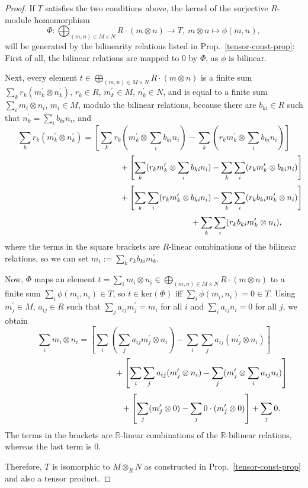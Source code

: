 \documentclass{amsart}
\theoremstyle{plain}
\numberwithin{equation}{section} %
\numberwithin{figure}{section} %
\theoremstyle{plain}
\theoremstyle{plain}
\theoremstyle{plain}
\theoremstyle{plain}
\theoremstyle{plain}
\theoremstyle{plain}
\theoremstyle{remark}
\theoremstyle{remark}
\theoremstyle{remark}
\begin{document}
\begin{proof}
If $T$ satisfies the two conditions above, the kernel of the surjective $R$-module homomorphism
\[ \Phi : \bigoplus_{(m,n) \in M \times N} R \cdot (m \otimes n) \rightarrow T,\ m \otimes n \mapsto \phi(m,n), \]
will be generated by the bilinearity relations listed in Prop.~\ref{tensor-const-prop}: First of all, the bilinear relations are mapped to $0$ by $\Phi$, as $\phi$ is bilinear. 

Next, every element $t \in \bigoplus_{(m,n) \in M \times N} R \cdot (m \otimes n)$ is a finite sum $\sum_k r_k(m_k^\prime \otimes n_k^\prime)$, $r_k \in R$, $m_k^\prime \in M$, $n_k^\prime \in N$, and is equal to a finite sum $\sum_i m_i \otimes n_i$, $m_i \in M$, modulo the bilinear relations, because there are $b_{ki} \in R$ such that $n_k^\prime = \sum_i b_{ki}n_i$, and
\[ \sum_k r_k(m_k^\prime \otimes n_k^\prime) = \left[ \sum_k r_k(m_k^\prime \otimes \sum_i b_{ki} n_i)
    - \sum_k(r_km_k^\prime \otimes \sum_i b_{ki} n_i) \right] \]
\[ \makebox[5cm]{} + \left[ \sum_k(r_km_k^\prime \otimes \sum_i b_{ki} n_i) - \sum_k \sum_i
     (r_km_k^\prime \otimes b_{ki}n_i) \right] \]
\[ \makebox[5cm]{} + \left[ \sum_k \sum_i (r_km_k^\prime \otimes b_{ki}n_i) - \sum_k \sum_i (r_kb_{ki}
    m_k^\prime \otimes n_i) \right] \]
\[ \makebox[7cm]{} + \sum_k \sum_i (r_kb_{ki} m_k^\prime \otimes n_i), \]
where the terms in the square brackets are $R$-linear combinations of the bilinear relations, so we can set $m_i := \sum_k r_kb_{ki} m_k^\prime$.
  
Now, $\Phi$ maps an element $t = \sum_i m_i \otimes n_i \in \bigoplus_{(m,n) \in M \times N} R \cdot (m \otimes n)$ to a finite sum $\sum_i \phi(m_i, n_i) \in T$, so $t \in \mathrm{ker}(\Phi)$ iff $\sum_i \phi(m_i, n_i) = 0 \in T$. Using $m_j^\prime \in M$, $a_{ij} \in R$ such that $\sum_j a_{ij}m_j^\prime = m_i$ for all $i$ and $\sum_i a_{ij} n_i = 0$ for all $j$, we obtain
\[ \sum_i m_i \otimes n_i = \left[ \sum_i (\sum_j a_{ij} m_j^\prime \otimes n_i) - 
             \sum_i \sum_j a_{ij} (m_j^\prime \otimes n_i) \right] \]
\[ \makebox[4cm]{} + \left[ \sum_i \sum_j a_{ij} (m_j^\prime \otimes n_i) - \sum_j (m_j^\prime \otimes \sum_i a_{ij} n_i) \right] \]  
\[ \makebox[4cm]{} + \left[ \sum_j (m_j^\prime \otimes 0) - \sum_j 0 \cdot (m_j^\prime \otimes 0) \right] + \sum_j 0. \]
The terms in the brackets are $\mathbb{R}$-linear combinations of the $\mathbb{R}$-bilinear relations, whereas the last term is $0$.

Therefore, $T$ is isomorphic to $M \otimes_R N$ as constructed in Prop.~\ref{tensor-const-prop} and also a tensor product.
\end{proof}
\end{document}
